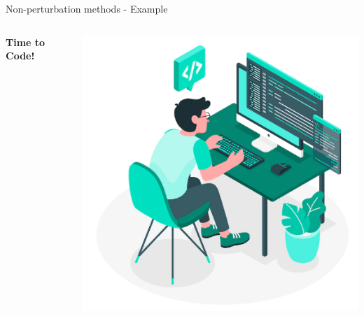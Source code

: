 \documentclass[
	aspectratio = 169
 ]{beamer}
\begin{document}
\begin{frame}{Non-perturbation methods - Example}

\begin{columns}
    \centering
    \Huge
    \textbf{Time to Code!}

    \centering
    \includegraphics[width=\linewidth]{Presentation TEX//gallery/coding.png}
\end{columns}

\end{frame}
\end{document}
